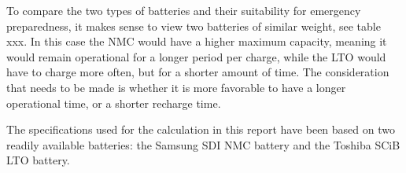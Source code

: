 \documentclass{article}
\begin{document}
To compare the two types of batteries and their suitability for emergency preparedness, it makes sense to view two batteries of similar weight, see table xxx. In this case the NMC would have a higher maximum capacity, meaning it would remain operational for a longer period per charge, while the LTO would have to charge more often, but for a shorter amount of time. The consideration that needs to be made is whether it is more favorable to have a longer operational time, or a shorter recharge time.

The specifications used for the calculation in this report have been based on two readily available batteries: the Samsung SDI NMC battery and the Toshiba SCiB LTO battery.

\begin{table}[H]
\end{table}
\end{document}
